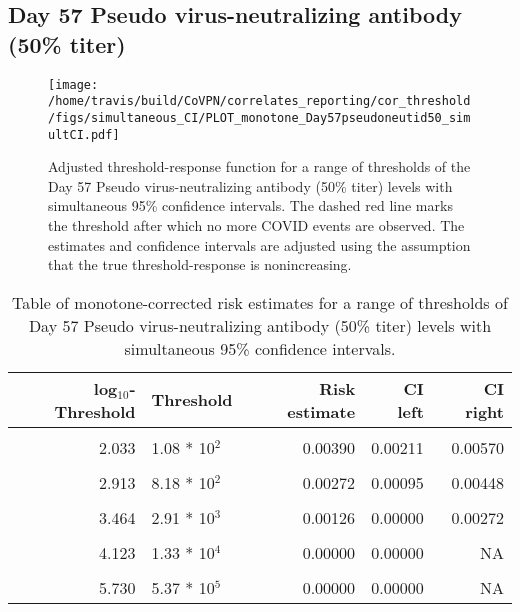 \documentclass[]{book}
\theoremstyle{definition}
\theoremstyle{definition}
\theoremstyle{definition}
\newcommand{\1}{\mathbbm{1}}
\begin{document}
\newpage

\newpage

\newpage

\hypertarget{day-57-pseudo-virus-neutralizing-antibody-50-titer-3}{%
\subsection{Day 57 Pseudo virus-neutralizing antibody (50\% titer)}\label{day-57-pseudo-virus-neutralizing-antibody-50-titer-3}}

\begin{figure}[H]
\centering
\texttt{[image: /home/travis/build/CoVPN/correlates\_reporting/cor\_threshold/figs/simultaneous\_CI/PLOT\_monotone\_Day57pseudoneutid50\_simultCI.pdf]}
\caption{Adjusted threshold-response function for a range of thresholds of the
  Day 57 Pseudo virus-neutralizing antibody (50\% titer) levels with simultaneous 95\% confidence intervals. The dashed red line marks the threshold after which no more COVID events are observed. The estimates and confidence intervals are adjusted using the assumption that the true threshold-response is nonincreasing.}
\end{figure}
\begin{table}[!h]

\caption{\label{tab:unnamed-chunk-399}Table of monotone-corrected risk estimates for a range of thresholds of Day 57 Pseudo virus-neutralizing antibody (50\% titer) levels with simultaneous 95\% confidence intervals.}
\centering
\begin{tabular}[t]{rlrrr}
\toprule
log$_{10}$-Threshold & Threshold & Risk estimate & CI left & CI right\\
\midrule
\cellcolor{gray!6}{0.699} & \cellcolor{gray!6}{5.00 * 10$^0$} & \cellcolor{gray!6}{0.00508} & \cellcolor{gray!6}{0.00314} & \cellcolor{gray!6}{0.00701}\\
2.033 & 1.08 * 10$^2$ & 0.00390 & 0.00211 & 0.00570\\
\cellcolor{gray!6}{2.447} & \cellcolor{gray!6}{2.80 * 10$^2$} & \cellcolor{gray!6}{0.00347} & \cellcolor{gray!6}{0.00165} & \cellcolor{gray!6}{0.00529}\\
2.913 & 8.18 * 10$^2$ & 0.00272 & 0.00095 & 0.00448\\
\cellcolor{gray!6}{3.196} & \cellcolor{gray!6}{1.57 * 10$^3$} & \cellcolor{gray!6}{0.00235} & \cellcolor{gray!6}{0.00055} & \cellcolor{gray!6}{0.00416}\\
3.464 & 2.91 * 10$^3$ & 0.00126 & 0.00000 & 0.00272\\
\cellcolor{gray!6}{3.736} & \cellcolor{gray!6}{5.45 * 10$^3$} & \cellcolor{gray!6}{0.00126} & \cellcolor{gray!6}{0.00000} & \cellcolor{gray!6}{0.00304}\\
4.123 & 1.33 * 10$^4$ & 0.00000 & 0.00000 & NA\\
\cellcolor{gray!6}{4.629} & \cellcolor{gray!6}{4.26 * 10$^4$} & \cellcolor{gray!6}{0.00000} & \cellcolor{gray!6}{0.00000} & \cellcolor{gray!6}{NA}\\
5.730 & 5.37 * 10$^5$ & 0.00000 & 0.00000 & NA\\
\bottomrule
\end{tabular}
\end{table}
\end{document}
